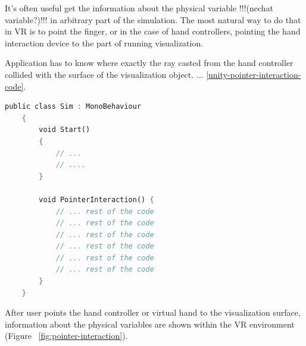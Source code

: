 %


It's often useful get the information about the physical variable !!!(nechat variable?)!!! in arbitrary part of the simulation. The most natural way to do that in VR is to point the finger, or in the case of hand controllers, pointing the hand interaction device to the part of running visualization. 

Application has to know where exactly the ray casted from the hand controller collided with the surface of the visualization object.  ... \ref{unity-pointer-interaction-code}.

\begin{lstlisting}[language=Rust, caption="Grab interaction code.", label=unity-pointer-interaction-code]
	public class Sim : MonoBehaviour
	{
		void Start()
		{
			// ...
			// ....
		}
		
		void PointerInteraction() {
			// ... rest of the code
			// ... rest of the code
			// ... rest of the code
			// ... rest of the code
			// ... rest of the code
			// ... rest of the code
		}
	}
\end{lstlisting}

After user points the hand controller or virtual hand to the visualization surface, information about the physical variables are shown within the VR environment (Figure~ \ref{fig:pointer-interaction}).

